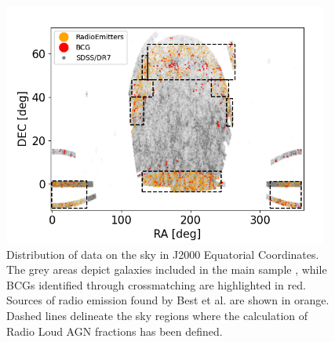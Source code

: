 \begin{figure}[hbtp]
  \centering
  \includegraphics[width=0.95\textwidth]{Fourth}
  \caption{Distribution of data on the sky in J2000 Equatorial Coordinates. The grey areas depict galaxies included in the main sample \cite{mpa-sdss-dr7}, while BCGs identified through crossmatching are highlighted in red. Sources of radio emission found by Best et al. \cite{2005MNRAS.362....9B} are shown in orange. Dashed lines delineate the sky regions where the calculation of Radio Loud AGN fractions has been defined. }
  \label{8}
\end{figure}

